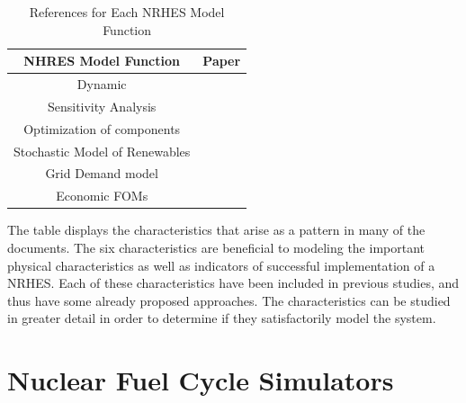 \documentclass{article}                                                                           %
\begin{document}
\begin{linenumbers}
\begin{table}[h!]
\centering
\caption{References for Each NRHES Model Function}
\begin{tabular}{ ||c | c|| }
 \hline
 NHRES Model Function & Paper \\ [0.5ex]
 \hline \hline
 Dynamic & \cite{Garcia2013, Du2014, Kazimi, Garcia2016}\\
 \hline
 Sensitivity Analysis & \cite{Shropshire2011, Rehman2010, Adaramola2014, Chen2016}\\
 \hline
 Optimization of components & \cite{Chen2016,Ozcan2016, Forsberg2009,Garcia2015,Aumeier2011}\\
 \hline
 Stochastic Model of Renewables & \cite{Rabiti2015, Garcia2016,Locatelli2015}\\
 \hline
 Grid Demand model & \cite{Forsberg2013, Garcia2016,Garcia2013,Ruth2014,Chen2016}\\
 \hline
  Economic FOMs & \cite{Garcia2016,Chen2016,Rabiti2015,Epiney2016,Bragg-Sitton2014}\\
 \hline
\end{tabular}
\label{table:1}
\end{table}

The table displays the characteristics that arise as a pattern in many of the documents.  The six characteristics are beneficial to modeling the important physical characteristics as well as indicators of successful implementation of a NRHES.  Each of these characteristics have been included in previous studies, and thus have some already proposed approaches.  The characteristics can be studied in greater detail in order to determine if they satisfactorily model the system.

\section{Nuclear Fuel Cycle Simulators}



\end{linenumbers}
\end{document}
